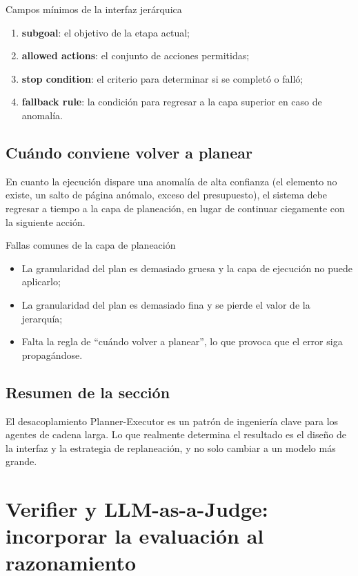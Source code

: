 \documentclass[a4paper]{article}
\begin{document}
\begin{importantbox}{Campos mínimos de la interfaz jerárquica}
\begin{enumerate}
    \item \textbf{subgoal}: el objetivo de la etapa actual;
    \item \textbf{allowed actions}: el conjunto de acciones permitidas;
    \item \textbf{stop condition}: el criterio para determinar si se completó o falló;
    \item \textbf{fallback rule}: la condición para regresar a la capa superior en caso de anomalía.
\end{enumerate}
\end{importantbox}

\subsection{Cuándo conviene volver a planear}
En cuanto la ejecución dispare una anomalía de alta confianza (el elemento no existe, un salto de página anómalo, exceso del presupuesto), el sistema debe regresar a tiempo a la capa de planeación, en lugar de continuar ciegamente con la siguiente acción.

\begin{warningbox}{Fallas comunes de la capa de planeación}
\begin{itemize}
    \item La granularidad del plan es demasiado gruesa y la capa de ejecución no puede aplicarlo;
    \item La granularidad del plan es demasiado fina y se pierde el valor de la jerarquía;
    \item Falta la regla de ``cuándo volver a planear'', lo que provoca que el error siga propagándose.
\end{itemize}
\end{warningbox}

\subsection{Resumen de la sección}
El desacoplamiento Planner-Executor es un patrón de ingeniería clave para los agentes de cadena larga. Lo que realmente determina el resultado es el diseño de la interfaz y la estrategia de replaneación, y no solo cambiar a un modelo más grande.

\section{Verifier y LLM-as-a-Judge: incorporar la evaluación al razonamiento}
\end{document}
